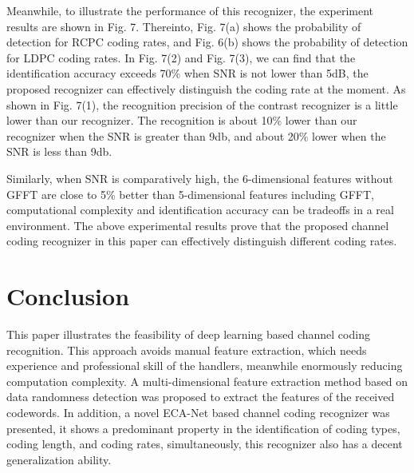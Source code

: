 \documentclass[conference]{IEEEtran}
\begin{document}
Meanwhile, to illustrate the performance of this recognizer, the experiment results are shown in Fig. 7. Thereinto, Fig. 7(a) shows the probability of detection for RCPC coding rates, and Fig. 6(b) shows the probability of detection for LDPC coding rates. In Fig. 7(2) and Fig. 7(3), we can find that the identification accuracy exceeds 70\% when SNR is not lower than 5dB, the proposed recognizer can effectively distinguish the coding rate at the moment. As shown in Fig. 7(1), the recognition precision of the contrast recognizer is a little lower than our recognizer. The recognition is about 10\% lower than our recognizer when the SNR is greater than 9db, and about 20\% lower when the SNR is less than 9db.

Similarly, when SNR is comparatively high, the 6-dimensional features without GFFT are close to 5\% better than 5-dimensional features including GFFT, computational complexity and identification accuracy can be tradeoffs in a real environment. The above experimental results prove that the proposed channel coding recognizer in this paper can effectively distinguish different coding rates. 

\section{Conclusion}
This paper illustrates the feasibility of deep learning based channel coding recognition. This approach avoids manual feature extraction, which needs experience and professional skill of the handlers, meanwhile enormously reducing computation complexity. A multi-dimensional feature extraction method based on data randomness detection was proposed to extract the features of the received codewords. In addition, a novel ECA-Net based channel coding recognizer was presented, it shows a predominant property in the identification of coding types, coding length, and coding rates, simultaneously, this recognizer also has a decent generalization ability.

 

\end{document}
